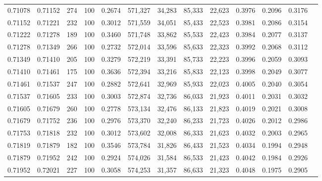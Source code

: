 \begin{tabular}{rrrrrrrrrrrrr}
0.71078 & 0.71152 &   274 & 100 &                                     0.2674 & 571,327 &  34,283 &  85,333 &  22,623 & 0.3976 & 0.2096 & 0.3176 \\
0.71152 & 0.71221 &   232 & 100 &                                     0.3012 & 571,559 &  34,051 &  85,433 &  22,523 & 0.3981 & 0.2086 & 0.3154 \\
0.71222 & 0.71278 &   189 & 100 &                                     0.3460 & 571,748 &  33,862 &  85,533 &  22,423 & 0.3984 & 0.2077 & 0.3137 \\
0.71278 & 0.71349 &   266 & 100 &                                     0.2732 & 572,014 &  33,596 &  85,633 &  22,323 & 0.3992 & 0.2068 & 0.3112 \\
0.71349 & 0.71410 &   205 & 100 &                                     0.3279 & 572,219 &  33,391 &  85,733 &  22,223 & 0.3996 & 0.2059 & 0.3093 \\
0.71410 & 0.71461 &   175 & 100 &                                     0.3636 & 572,394 &  33,216 &  85,833 &  22,123 & 0.3998 & 0.2049 & 0.3077 \\
0.71461 & 0.71537 &   247 & 100 &                                     0.2882 & 572,641 &  32,969 &  85,933 &  22,023 & 0.4005 & 0.2040 & 0.3054 \\
0.71537 & 0.71605 &   233 & 100 &                                     0.3003 & 572,874 &  32,736 &  86,033 &  21,923 & 0.4011 & 0.2031 & 0.3032 \\
0.71605 & 0.71679 &   260 & 100 &                                     0.2778 & 573,134 &  32,476 &  86,133 &  21,823 & 0.4019 & 0.2021 & 0.3008 \\
0.71679 & 0.71752 &   236 & 100 &                                     0.2976 & 573,370 &  32,240 &  86,233 &  21,723 & 0.4026 & 0.2012 & 0.2986 \\
0.71753 & 0.71818 &   232 & 100 &                                     0.3012 & 573,602 &  32,008 &  86,333 &  21,623 & 0.4032 & 0.2003 & 0.2965 \\
0.71819 & 0.71879 &   182 & 100 &                                     0.3546 & 573,784 &  31,826 &  86,433 &  21,523 & 0.4034 & 0.1994 & 0.2948 \\
0.71879 & 0.71952 &   242 & 100 &                                     0.2924 & 574,026 &  31,584 &  86,533 &  21,423 & 0.4042 & 0.1984 & 0.2926 \\
0.71952 & 0.72021 &   227 & 100 &                                     0.3058 & 574,253 &  31,357 &  86,633 &  21,323 & 0.4048 & 0.1975 & 0.2905 \\

\end{tabular}
